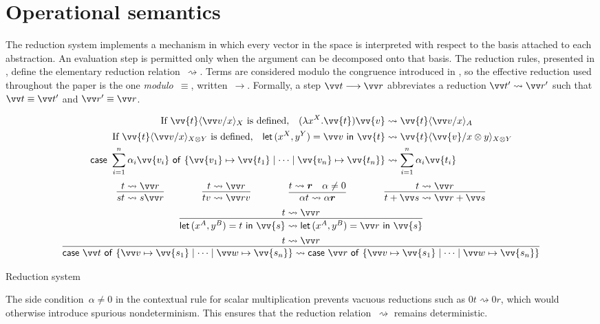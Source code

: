\documentclass[runningheads,orivec,envcountsame,envcountsect]{llncs}
\newcommand\lra{\longrightarrow}
\newcommand\ansubst[2]{\ensuremath{\langle #1 \rangle_{#2}}}
\def\Pair#1#2{(#1,#2)} %
\def\Lam#1#2#3{\lambda#1^{#2}{.}#3} %
\def\letkeyword{\mathsf{let}}
\def\inkeyword{\mathsf{in}}
\def\LetP#1#2#3#4#5#6{\letkeyword\,\Pair{#1^{#2}}{#3^{#4}}=#5~\inkeyword~#6}
\def\gencase#1#2#3#4#5{\ensuremath{\mathsf{case}~#1~\mathsf{of}~\{#2\mapsto #4 \mid \dotsb \mid #3\mapsto #5\}}}
\def\lraneq{\rightsquigarrow}
\begin{document}
\section{Operational semantics}\label{sec:reduction}

The reduction system implements a mechanism in which every vector in the space
is interpreted with respect to the basis attached to each abstraction. An
evaluation step is permitted only when the argument can be decomposed onto that
basis. The reduction rules, presented in
, define the elementary
reduction relation~$\lraneq$. Terms are considered modulo the congruence
introduced in , so the
effective reduction used throughout the paper is the one
\emph{modulo~$\equiv$}, written~$\lra$.  Formally, a step $\vv t\lra\vv r$
abbreviates a reduction $\vv t'\lraneq\vv r'$ such that $\vv t\equiv\vv t'$
and $\vv r'\equiv\vv r$.

\begin{table}[t]
  \begin{align*}
    \text{If }\vv{t}\ansubst{\vv v/x}{X}\text{ is defined,}\quad
    (\Lam{x}{X}{\vv{t}})\vv{v}
    &\lraneq \vv{t}\ansubst{\vv v/x}{A}\\
    \text{If }\vv{t}\ansubst{\vv v/x}{X\otimes Y}\text{ is defined,}\quad
    \LetP{x}{X}{y}{Y}{\vv v}{\vv{t}}
    &\lraneq \vv{t}\ansubst{\vv{v}/x\otimes y}{X\otimes Y}\\
    \gencase{\sum_{i=1}^{n}\alpha_i \vv{v_i}}{\vv{v_1}}{\vv{v_n}}{\vv{t_1}}{\vv{t_n}}
    &\lraneq \sum_{i=1}^{n}\alpha_i \vv{t_i}
  \end{align*}
  \[
    \begin{array}{c}
      \infer{st\lraneq s\vv r}{t\lraneq \vv r}
      \qquad\qquad
      \infer{tv\lraneq \vv rv}{t\lraneq\vv r}
      \qquad\qquad
      \infer{\alpha t\lraneq \alpha \vec r}{t\lraneq\vec r & \alpha\neq 0}
      \qquad\qquad
      \infer{t+\vv s\lraneq\vv r+\vv s}{t\lraneq\vv r}
      \\[5pt]
      \infer{\LetP{x}{A}{y}{B}{t}{\vv{s}}\lraneq
      \LetP{x}{A}{y}{B}{\vv r}{\vv{s}}}{t\lraneq \vv r} 
      \\[5pt]
      \infer{\gencase{\vv t}{\vv v}{\vv w}{\vv{s_1}}{\vv{s_n}}\lraneq
      \gencase{\vv r}{\vv v}{\vv w}{\vv{s_1}}{\vv{s_n}}}{t\lraneq \vv r}
    \end{array}
  \]
  \caption{Reduction system}
  \label{tab:Reduction}
\end{table}

The side condition~$\alpha\neq0$ in the contextual rule for scalar
multiplication prevents vacuous reductions such as $0t\lraneq 0r$, which would
otherwise introduce spurious nondeterminism. This ensures that the reduction
relation~$\lraneq$ remains deterministic.
\end{document}
